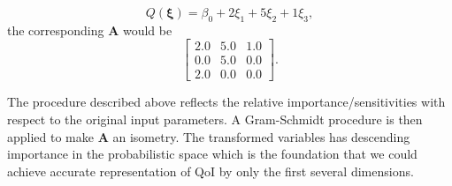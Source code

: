 \begin{equation*}
 Q(\bm{\xi}) = \beta_0 + 2 \xi_1 + 5 \xi_2 + 1 \xi_3,
\end{equation*}
the corresponding $\bm{A}$ would be
\begin{equation*}
\begin{bmatrix}
2.0 & 5.0 & 1.0 \\
0.0 & 5.0 & 0.0 \\
2.0 & 0.0 & 0.0
\end{bmatrix}.
\end{equation*}

The procedure described above reflects the relative importance/sensitivities with respect to the original input parameters. A Gram-Schmidt procedure is then applied to make $\bm{A}$ an isometry.
The transformed variables has descending importance in the probabilistic space which is the foundation that we could achieve accurate representation of QoI by only the first several dimensions.

